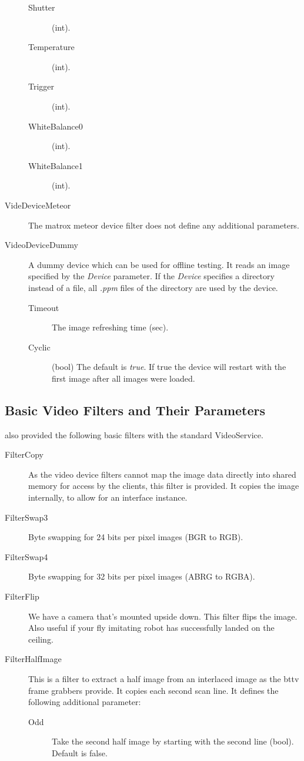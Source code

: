 \begin{description}
\begin{description}
  \item[Shutter] (int).
  \item[Temperature] (int).
  \item[Trigger] (int).
  \item[WhiteBalance0] (int).
  \item[WhiteBalance1] (int).
  \end{description}
\item[VideDeviceMeteor] The matrox meteor device filter does not
  define any additional parameters.
\item[VideoDeviceDummy] A dummy device which can be used for offline
  testing.  It reads an image specified by the {\em Device} parameter.
  If the {\em Device} specifies a directory instead of a file, all
  {\em *.ppm} files of the directory are used by the device.
  \begin{description}
  \item[Timeout] The image refreshing time (sec).
  \item[Cyclic] (bool) The default is {\em true}. If true the device
    will restart with the first image after all images were loaded.
  \end{description}
\end{description}

\subsection{Basic Video Filters and Their Parameters}

\miro also provided the following basic filters with the standard
VideoService.

\begin{description}
\item[FilterCopy] As the video device filters cannot map the image
  data directly into shared memory for access by the clients, this
  filter is provided. It copies the image internally, to allow for an
  interface instance.
\item[FilterSwap3] Byte swapping for 24 bits per pixel images (BGR to RGB).
\item[FilterSwap4] Byte swapping for 32 bits per pixel images (ABRG to
  RGBA).
\item[FilterFlip] We have a camera that's mounted upside down. This
  filter flips the image. Also useful if your fly imitating robot has
  successfully landed on the ceiling.
\item[FilterHalfImage] This is a filter to extract a half image from an
  interlaced image as the bttv frame grabbers provide. It copies each
  second scan line. It defines the
  following additional parameter:
  \begin{description}
  \item[Odd] Take the second half image by starting with the second
    line (bool). Default is false.
  \end{description}
\end{description}

